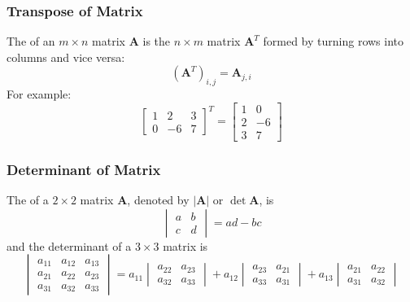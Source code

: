 \subsubsection{Transpose of Matrix}
The  of an $m \times n$ matrix $\mathbf{A}$ is the $n \times m$ matrix $\mathbf{A}^T$ formed by turning rows into columns and vice versa:
\[ (\mathbf{A}^T)_{i,j} = \mathbf{A}_{j,i} \]
For example:
\[ \begin{bmatrix}
    1 & 2 & 3 \\
    0 & -6 & 7
\end{bmatrix}^T =
\begin{bmatrix}
    1 & 0 \\
    2 & -6 \\
    3 & 7
\end{bmatrix} \]

\subsubsection{Determinant of Matrix}
The  of a $2 \times 2$ matrix $\mathbf{A}$, denoted by $|\mathbf{A}|$ or $\det\mathbf{A}$, is
\[ \begin{vmatrix}
    a & b\\
    c & d
\end{vmatrix} = ad-bc \]
and the determinant of a $3 \times 3$ matrix is
\[ \begin{vmatrix}
    a_{11} & a_{12} & a_{13}\\ 
    a_{21} & a_{22} & a_{23}\\
    a_{31} & a_{32} & a_{33} 
\end{vmatrix}
= a_{11}\begin{vmatrix} 
    a_{22} & a_{23} \\ 
    a_{32} & a_{33}
\end{vmatrix} 
+ a_{12}\begin{vmatrix}
    a_{23} & a_{21} \\ 
    a_{33} & a_{31}
\end{vmatrix} 
+ a_{13}\begin{vmatrix}
    a_{21} & a_{22} \\
    a_{31} & a_{32}
\end{vmatrix}
 \]

